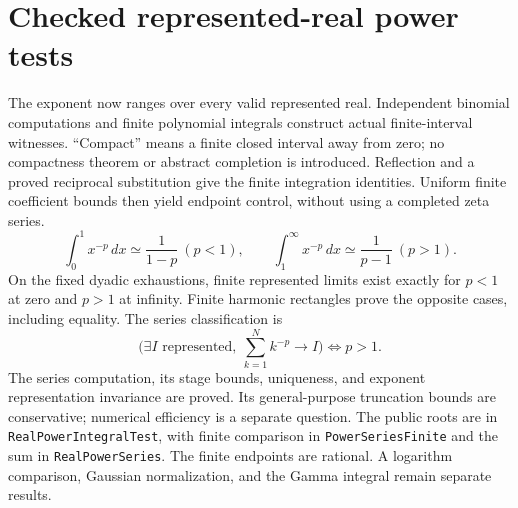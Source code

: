 \section{Checked represented-real power tests}
The exponent now ranges over every valid represented real. Independent
binomial computations and finite polynomial integrals construct actual
finite-interval witnesses. ``Compact'' means a finite closed interval away
from zero; no compactness theorem or abstract completion is introduced.
Reflection and a proved reciprocal substitution give the finite integration
identities. Uniform finite coefficient bounds then yield endpoint control,
without using a completed zeta series.
\[
\int_0^1 x^{-p}\,dx\simeq\frac1{1-p}\ (p<1),\qquad
\int_1^\infty x^{-p}\,dx\simeq\frac1{p-1}\ (p>1).
\]
On the fixed dyadic exhaustions, finite represented limits exist exactly for
\(p<1\) at zero and \(p>1\) at infinity. Finite harmonic rectangles prove the
opposite cases, including equality. The series classification is
\[
\bigl(\exists I\text{ represented},\ \sum_{k=1}^N k^{-p}\longrightarrow I\bigr)
\iff p>1.
\]
The series computation, its stage bounds, uniqueness, and exponent
representation invariance are proved. Its general-purpose truncation bounds
are conservative; numerical efficiency is a separate question.
The public roots are in \texttt{RealPowerIntegralTest}, with finite comparison
in \texttt{PowerSeriesFinite} and the sum in \texttt{RealPowerSeries}.
The finite endpoints are rational. A logarithm comparison, Gaussian
normalization, and the Gamma integral remain separate results.
